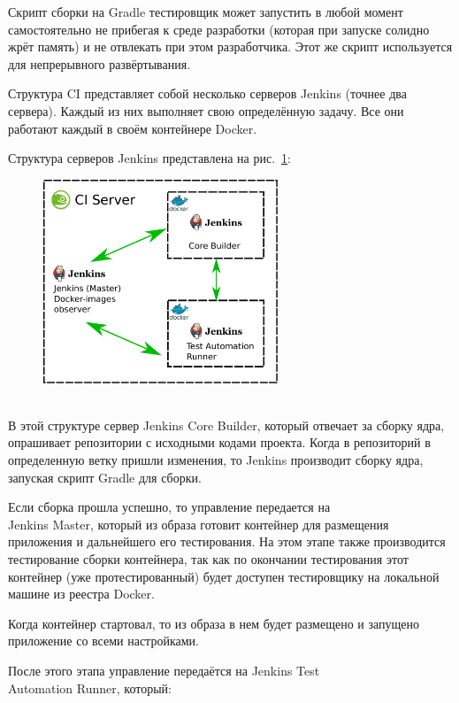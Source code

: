 \documentclass[10pt, a5paper]{article}
\begin{document}
Скрипт сборки на Gradle тестировщик может запустить в любой момент самостоятельно не прибегая к среде разработки (которая при запуске солидно жрёт память) и не отвлекать при этом разработчика.
Этот же скрипт используется для непрерывного развёртывания.

Структура CI представляет собой несколько серверов Jenkins (точнее два сервера). Каждый из них выполняет свою определённую задачу. Все они работают каждый в своём контейнере Docker.

Структура серверов Jenkins представлена на рис.~\ref{Gagarin4}:

\begin{center}
\begin{figure}[h!]
  \centering
  \includegraphics[width=7cm]{13_2018_Gagarin4}
  \caption{~}
  \label{Gagarin4}
\end{figure}
\end{center} 

В этой структуре сервер Jenkins Core Builder, который отвечает за сборку ядра, опрашивает репозитории с исходными кодами проекта. Когда в репозиторий в определенную ветку пришли изменения, то Jenkins производит сборку ядра, запуская скрипт Gradle для сборки.

Если сборка прошла успешно, то управление передается на\\ Jenkins Master, который из образа готовит контейнер для размещения приложения и дальнейшего его тестирования. На этом этапе также производится тестирование сборки контейнера, так как по окончании тестирования этот контейнер (уже протестированный) будет доступен тестировщику на локальной машине из реестра Docker.

Когда контейнер стартовал, то из образа в нем будет размещено и запущено приложение со всеми настройками.

После этого этапа управление передаётся на Jenkins Test\\ Automation Runner, который:
\end{document}
